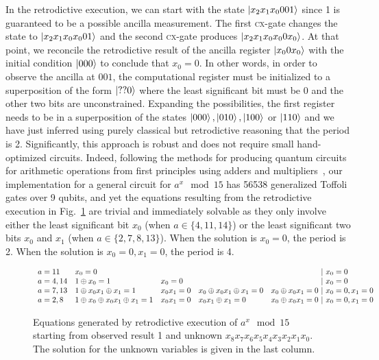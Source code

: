\documentclass{article}
\newcommand{\cx}{\textsc{cx}}
\begin{document}
\begin{refsection}
In the retrodictive execution, we can start with the state
$\ket{x_2x_1x_0001}$ since 1 is guaranteed to be a possible
ancilla measurement. The first \cx-gate changes the state to
$\ket{x_2x_1x_0x_001}$ and the second \cx-gate produces
$\ket{x_2x_1x_0x_00x_0}$. At that point, we reconcile the
retrodictive result of the ancilla register $\ket{x_00x_0}$ with the
initial condition $\ket{000}$ to conclude that $x_0=0$. In other
words, in order to observe the ancilla at $001$, the computational
register must be initialized to a superposition of the form
$\ket{??0}$ where the least significant bit must be 0 and the other
two bits are unconstrained. Expanding the possibilities, the first
register needs to be in a superposition of the states $\ket{000},
\ket{010}, \ket{100}$ or $\ket{110}$ and we have just inferred using
purely classical but retrodictive reasoning that the period is
2. Significantly, this approach is robust and does not require small
hand-optimized circuits. Indeed, following the methods for producing
quantum circuits for arithmetic operations from first principles using
adders and multipliers~\cite{PhysRevA.54.147}, our implementation for
a general circuit for $a^x \mod{15}$ has 56538 generalized Toffoli
gates over 9 qubits, and yet the equations resulting from the
retrodictive execution in Fig.~\ref{fig:shor-eqs} are trivial and
immediately solvable as they only involve either the least significant
bit $x_0$ (when $a \in \{4,11,14\}$) or the least significant two bits
$x_0$ and $x_1$ (when $a \in \{2,7,8,13\}$). When the solution is
$x_0=0$, the period is 2. When the solution is $x_0=0,x_1=0$, the
period is 4.

\begin{figure}
\[\begin{array}{l@{\quad}llll@{~|~}l}
a=11 & x_0 = 0 &&&& x_0 = 0 \\
a=4,14 & 1 \oplus x_0 = 1 & x_0 = 0 &&
  & x_0 = 0 \\
a=7,13 & 1 \oplus x_0x_1 \oplus x_1 = 1 & x_0x_1 = 0 & x_0 \oplus x_0x_1 \oplus x_1 = 0 &  x_0 \oplus x_0x_1 = 0 & x_0=0, x_1=0 \\
a=2,8 & 1 \oplus x_0 \oplus x_0x_1 \oplus x_1 = 1 & x_0x_1 = 0 & x_0x_1 \oplus x_1 = 0 & x_0 \oplus x_0x_1 = 0  & x_0=0,x_1=0
\end{array}\]
\caption{\label{fig:shor-eqs}Equations generated by retrodictive
  execution of $a^x \mod{15}$ starting from observed result 1 and
  unknown $x_8x_7x_6x_5x_4x_3x_2x_1x_0$. The solution for the unknown
  variables is given in the last column.}
\end{figure}


\end{refsection}
\end{document}

